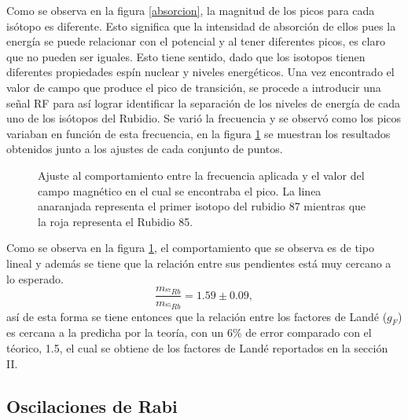 \documentclass[%
 reprint,
 amsmath,amssymb,
 aps,
]{revtex4-1}
\begin{document}
Como se observa en la figura \ref{absorcion}, la magnitud de los picos para cada isótopo es diferente. Esto significa que la intensidad de absorción de ellos pues la energía se puede relacionar con el potencial y al tener diferentes picos, es claro que no pueden ser iguales. Esto tiene sentido, dado que los isotopos tienen diferentes propiedades espín nuclear y niveles energéticos.
Una vez encontrado el valor de campo que produce el pico de transición, se procede a introducir una señal RF para así lograr identificar la separación de los niveles de energía de cada uno de los isótopos del Rubidio. Se varió la frecuencia y se observó como los picos variaban en función de esta frecuencia, en la figura \ref{feq_corr} se muestran los resultados obtenidos junto a los ajustes de cada conjunto de puntos.
\begin{figure}[h]
\caption{\label{feq_corr} Ajuste al comportamiento entre la frecuencia aplicada y el valor del campo magnético en el cual se encontraba el pico. La linea anaranjada representa el primer isotopo del rubidio 87 mientras que la roja representa el Rubidio 85.}
\end{figure}
Como se observa en la figura \ref{feq_corr}, el comportamiento que se observa es de tipo lineal y además se tiene que la relación entre sus pendientes está muy cercano a lo esperado.
\begin{equation}
    \frac{m_{^{87}Rb}}{m_{^{85}Rb}}= 1.59\pm 0.09,
    \label{relacion_pendientes}
\end{equation}
así de esta forma se tiene entonces que la relación entre los factores de Landé ($g_F$) es cercana a la predicha por la teoría, con un 6\% de error comparado con el téorico, 1.5, el cual se obtiene de los factores de Landé reportados en la sección II.
\subsection{Oscilaciones de Rabi}
\end{document}
